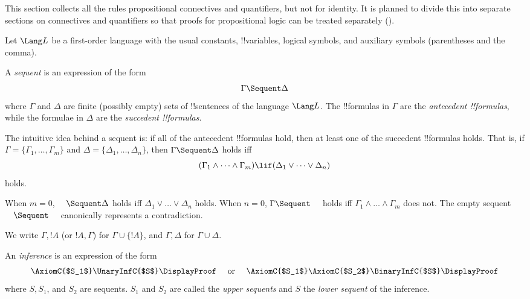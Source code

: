 \documentclass[../../../include/open-logic-section]{subfiles}
\begin{document}


\begin{editorial}
  This section collects all the rules propositional connectives and
  quantifiers, but not for identity.  It is planned to divide this
  into separate sections on connectives and quantifiers so that proofs
  for propositional logic can be treated separately
  ().
\end{editorial}

Let $\Lang L$ be a first-order language with the usual constants,
!!{variable}s, logical symbols, and auxiliary symbols (parentheses
and the comma).

\begin{defn}[sequent]
A \emph{sequent} is an expression of the form
\[ \Gamma \Sequent \Delta \]
where $\Gamma$ and $\Delta$ are finite (possibly empty) sets of
!!{sentence}s of the language $\Lang L$. The !!{formula}s in $\Gamma$
are the \emph{antecedent !!{formula}s}, while the formulae in $\Delta$ are
the \emph{succedent !!{formula}s}.

The intuitive idea behind a sequent is: if all of the antecedent
!!{formula}s hold, then at least one of the succedent !!{formula}s
holds. That is, if $\Gamma = \{ \Gamma_1, \dots, \Gamma_m\}$ and
$\Delta = \{ \Delta_1, \dots, \Delta_n\}$, then $\Gamma \Sequent
\Delta$ holds iff
\[
(\Gamma_1 \land \cdots \land \Gamma_m) \lif (\Delta_1 \lor \cdots \lor
\Delta_n) \] holds.

When $m=0$, $\quad \Sequent \Delta$ holds iff $\Delta_1 \lor \dots
\lor \Delta_n$ holds. When $n=0$, $\Gamma \Sequent \quad$ holds iff
$\Gamma_1 \land \dots \land \Gamma_m$ does not. The
empty sequent $\quad \Sequent \quad$ canonically represents a
contradiction.
\end{defn}

We write $\Gamma, !A$ (or $!A, \Gamma$) for $\Gamma \cup \{!A\}$, and
$\Gamma, \Delta$ for $\Gamma \cup \Delta$.

\begin{defn}[Inference]
An \emph{inference} is an expression of the form
\[
\AxiomC{$S_1$}
\UnaryInfC{$S$}
\DisplayProof
\quad
\textrm{  or  }
\quad
\AxiomC{$S_1$}
\AxiomC{$S_2$}
\BinaryInfC{$S$}
\DisplayProof
\]
where $S, S_1$, and $S_2$ are sequents. $S_1$ and $S_2$ are called the
\emph{upper sequents} and $S$ the \emph{lower sequent} of the
inference.
\end{defn}
\end{document}
